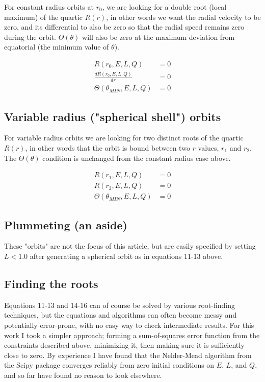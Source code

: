 \documentclass[11pt]{article}
\begin{document}
For constant radius orbits at $r_0$, we are looking for a double root (local maximum) of the quartic $R(r)$, in other words we want the radial velocity to be zero, and its differential to also be zero so that the radial speed remains zero during the orbit.  $\Theta (\theta)$ will also be zero at the maximum deviation from equatorial (the minimum value of $\theta$).

\begin{align}
R(r_0, E, L, Q) &= 0 \\
\frac{d R(r_0, E, L, Q)}{d r} &= 0 \\
\Theta(\theta_{MIN}, E, L, Q) &= 0
\end{align}

\subsection{Variable radius ("spherical shell") orbits}

For variable radius orbits we are looking for two distinct roots of the quartic $R(r)$, in other words that the orbit is bound between two $r$ values, $r_1$ and $r_2$.  The $\Theta (\theta)$ condition is unchanged from the constant radius case above.

\begin{align}
R(r_1, E, L, Q) &= 0 \\
R(r_2, E, L, Q) &= 0 \\
\Theta(\theta_{MIN}, E, L, Q) &= 0
\end{align}

\subsection{Plummeting (an aside)}

These "orbits" are not the focus of this article, but are easily specified by setting $L < 1.0$ after generating a spherical orbit as in equations 11-13 above.

\subsection{Finding the roots}

Equations 11-13 and 14-16 can of course be solved by various root-finding techniques, but the equations and algorithms can often become messy and potentially error-prone, with no easy way to check intermediate results.  For this work I took a simpler approach; forming a sum-of-squares error function from the constraints described above, minimizing it, then making sure it is sufficiently close to zero.  By experience I have found that the Nelder-Mead algorithm from the Scipy package converges reliably from zero initial conditions on $E$, $L$, and $Q$, and so far have found no reason to look elsewhere.
\end{document}
